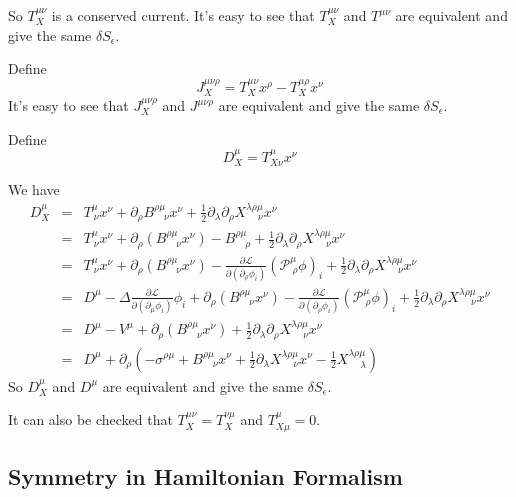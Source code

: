 \documentclass[12pt]{book}
\begin{document}
	So $T_X^{\mu\nu}$ is a conserved current. It's easy to see that $T_X^{\mu\nu}$ and $T^{\mu\nu}$ are equivalent and give the same $\delta S_\epsilon$.
	
	Define
	\begin{equation}
		J_X^{\mu\nu\rho}=T_X^{\mu\nu}x^\rho-T_X
		^{\mu\rho}x^\nu
	\end{equation}
	It's easy to see that $J_X^{\mu\nu\rho}$ and $J^{\mu\nu\rho}$ are equivalent and give the same $\delta S_\epsilon$.
	
	Define
	\begin{equation}
		D_X^\mu=T^\mu_{X\nu}x^\nu
	\end{equation}
	
	We have
	\begin{eqnarray}
		D_X^\mu&=&T^\mu_{\ \nu}x^\nu+\partial_\rho B^{\rho\mu}_{\quad\nu}x^\nu+\frac 12 \partial_\lambda\partial_\rho X^{\lambda\rho\mu}_{\quad\ \nu}x^\nu\\
		&=&T^\mu_{\ \nu}x^\nu+\partial_\rho (B^{\rho\mu}_{\quad\nu}x^\nu)-B^{\rho\mu}_{\quad\rho}+\frac 12 \partial_\lambda\partial_\rho X^{\lambda\rho\mu}_{\quad\ \nu}x^\nu\\
		&=&T^\mu_{\ \nu}x^\nu+\partial_\rho (B^{\rho\mu}_{\quad\nu}x^\nu)-\frac{\partial\mathcal L}{\partial(\partial_\rho\phi_i)}(\mathcal P^\mu_{\ \rho}\phi)_i+\frac 12 \partial_\lambda\partial_\rho X^{\lambda\rho\mu}_{\quad\ \nu}x^\nu\\
		&=&D^\mu-\Delta\frac{\partial\mathcal{L}}{\partial(\partial_\mu\phi_i)}\phi_i+\partial_\rho (B^{\rho\mu}_{\quad\nu}x^\nu)-\frac{\partial\mathcal L}{\partial(\partial_\rho\phi_i)}(\mathcal P^\mu_{\ \rho}\phi)_i+\frac 12 \partial_\lambda\partial_\rho X^{\lambda\rho\mu}_{\quad\ \nu}x^\nu\\
		&=&D^\mu-V^\mu+\partial_\rho (B^{\rho\mu}_{\quad\nu}x^\nu)+\frac 12 \partial_\lambda\partial_\rho X^{\lambda\rho\mu}_{\quad\ \nu}x^\nu\\
		&=&D^\mu+\partial_\rho (-\sigma^{\rho\mu}+ B^{\rho\mu}_{\quad\nu}x^\nu+\frac 12 \partial_\lambda X^{\lambda\rho\mu}_{\quad\ \nu}x^\nu-\frac 12 X^{\lambda\rho\mu}_{\quad\ \lambda})
	\end{eqnarray}
	So $D_X^\mu$ and $D^\mu$ are equivalent and give the same $\delta S_\epsilon$.
	
	It can also be checked that $T_X^{\mu\nu}=T_X^{\nu\mu}$ and $T^\mu_{X\mu}=0$.
	
	\subsection{Symmetry in Hamiltonian Formalism}	
	
\end{document}
